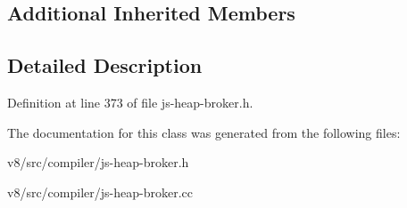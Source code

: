 \subsection*{Additional Inherited Members}


\subsection{Detailed Description}


Definition at line 373 of file js-\/heap-\/broker.\+h.



The documentation for this class was generated from the following files\+:\begin{DoxyCompactItemize}
\item 
v8/src/compiler/js-\/heap-\/broker.\+h\item 
v8/src/compiler/js-\/heap-\/broker.\+cc\end{DoxyCompactItemize}
